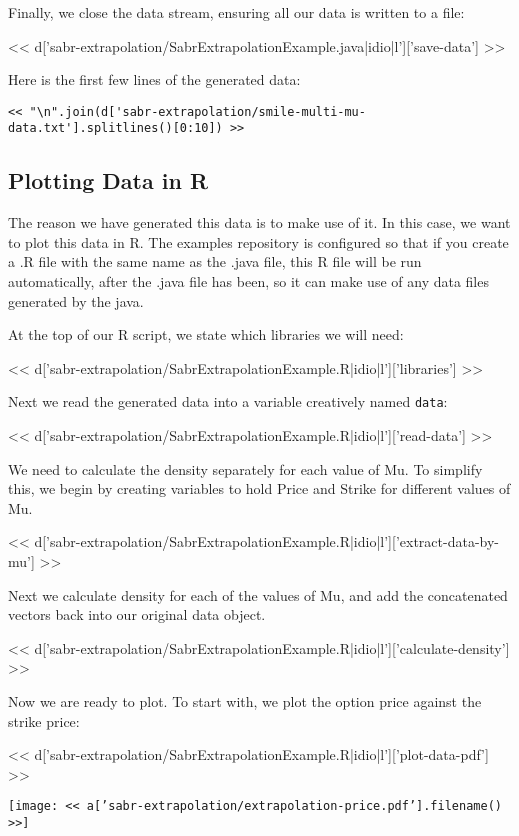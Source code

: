 Finally, we close the data stream, ensuring all our data is written to a file:

<< d['sabr-extrapolation/SabrExtrapolationExample.java|idio|l']['save-data'] >>

Here is the first few lines of the generated data:

\begin{Verbatim}
<< "\n".join(d['sabr-extrapolation/smile-multi-mu-data.txt'].splitlines()[0:10]) >>
\end{Verbatim}

\subsection{Plotting Data in R}

The reason we have generated this data is to make use of it. In this case, we
want to plot this data in R. The examples repository is configured so that if
you create a .R file with the same name as the .java file, this R file will
be run automatically, after the .java file has been, so it can make use of any
data files generated by the java.

At the top of our R script, we state which libraries we will need:

<< d['sabr-extrapolation/SabrExtrapolationExample.R|idio|l']['libraries'] >>

Next we read the generated data into a variable creatively named \verb|data|:

<< d['sabr-extrapolation/SabrExtrapolationExample.R|idio|l']['read-data'] >>

We need to calculate the density separately for each value of Mu. To simplify
this, we begin by creating variables to hold Price and Strike for different
values of Mu.

<< d['sabr-extrapolation/SabrExtrapolationExample.R|idio|l']['extract-data-by-mu'] >>

Next we calculate density for each of the values of Mu, and add the
concatenated vectors back into our original data object.

<< d['sabr-extrapolation/SabrExtrapolationExample.R|idio|l']['calculate-density'] >>

Now we are ready to plot. To start with, we plot the option price against the strike price:

<< d['sabr-extrapolation/SabrExtrapolationExample.R|idio|l']['plot-data-pdf'] >>

\texttt{[image: << a['sabr-extrapolation/extrapolation-price.pdf'].filename() >>]}

